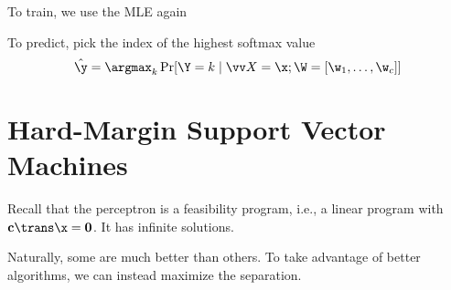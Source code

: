 \documentclass[class=cs480,notes,tikz]{agony}
\begin{document}
To train, we use the MLE again

To predict, pick the index of the highest softmax value
\[ \hat{\y} = \argmax_k \Pr[\Y = k \mid \vv X = \x; \W = [\w_1,\dotsc,\w_c]] \]

\section{Hard-Margin Support Vector Machines}\label{ch:hsvm}


Recall that the perceptron is a feasibility program, i.e.,
a linear program with $\vb c\trans \x = \vb 0$.
It has infinite solutions.

Naturally, some are much better than others.
To take advantage of better algorithms, we can instead maximize the separation.
\end{document}

